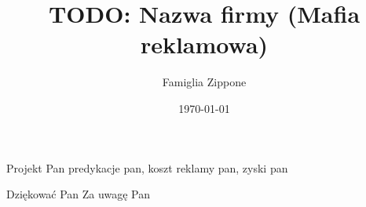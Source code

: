 \documentclass{beamer}
\title{TODO: Nazwa firmy (Mafia reklamowa)}
\author{Famiglia Zippone}
\institute{UWr}
\date{\today}
\begin{document}
\begin{frame}
\titlepage
\end{frame}

\begin{frame}{Projekt Pan}
predykacje pan, koszt reklamy pan, zyski pan
\end{frame}

\begin{frame}{Dziękować Pan}
Za uwagę Pan
\end{frame}
\end{document}
